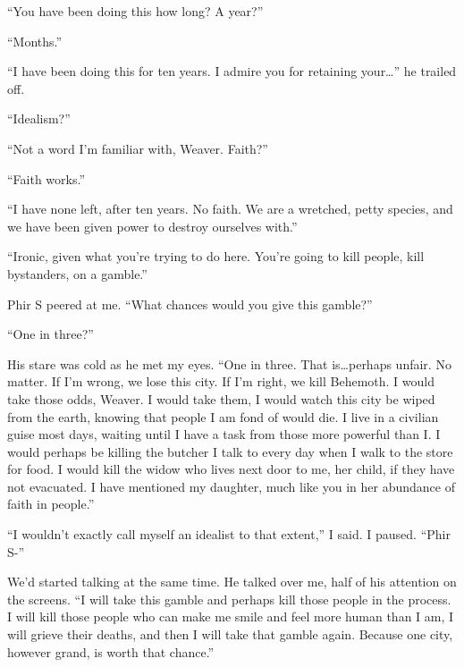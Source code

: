 ``You have been doing this how long?  A year?''



``Months.''



``I have been doing this for ten years.  I admire you for retaining your\ldots'' he trailed off.



``Idealism?''



``Not a word I'm familiar with, Weaver.  Faith?''



``Faith works.''



``I have none left, after ten years.  No faith.  We are a wretched, petty species, and we have been given power to destroy ourselves with.''



``Ironic, given what you're trying to do here.  You're going to kill people, kill bystanders, on a gamble.''



Phir S peered at me.  ``What chances would you give this gamble?''



``One in three?''



His stare was cold as he met my eyes.  ``One in three.  That is\ldots perhaps unfair.  No matter.  If I'm wrong, we lose this city.  If I'm right, we kill Behemoth.  I would take those odds, Weaver.  I would take them, I would watch this city be wiped from the earth, knowing that people I am fond of would die.  I live in a civilian guise most days, waiting until I have a task from those more powerful than I.  I would perhaps be killing the butcher I talk to every day when I walk to the store for food.  I would kill the widow who lives next door to me, her child, if they have not evacuated.  I have mentioned my daughter, much like you in her abundance of faith in people.''



``I wouldn't exactly call myself an idealist to that extent,'' I said.  I paused.  ``Phir S-''



We'd started talking at the same time.  He talked over me, half of his attention on the screens.  ``I will take this gamble and perhaps kill those people in the process.  I will kill those people who can make me smile and feel more human than I am, I will grieve their deaths, and then I will take that gamble again.  Because one city, however grand, is worth that chance.''



